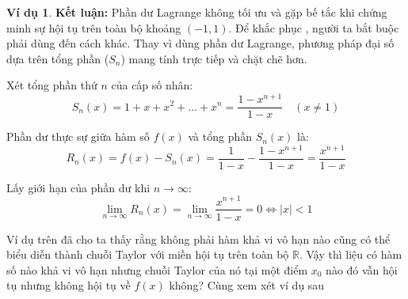 \documentclass[12pt]{article}
\theoremstyle{definition}
\newtheorem*{example}{Ví dụ}
\theoremstyle{remark}
\begin{document}
\begin{example}
\textbf{Kết luận:} Phần dư Lagrange không tối ưu và gặp bế tắc khi chứng minh sự hội tụ trên toàn bộ khoảng $(-1, 1)$. Để khắc phục , người ta bắt buộc phải dùng đến cách khác.
Thay vì dùng phần dư Lagrange, phương pháp đại số dựa trên tổng phần ($S_n$) mang tính trực tiếp và chặt chẽ hơn.

Xét tổng phần thứ $n$ của cấp số nhân:
\begin{equation}
S_n(x) = 1 + x + x^2 + \dots + x^n = \frac{1 - x^{n+1}}{1 - x} \quad (x \neq 1)
\end{equation}

Phần dư thực sự giữa hàm số $f(x)$ và tổng phần $S_n(x)$ là:
\begin{equation}
R_n(x) = f(x) - S_n(x) = \frac{1}{1-x} - \frac{1 - x^{n+1}}{1 - x} = \frac{x^{n+1}}{1-x}
\end{equation}

Lấy giới hạn của phần dư khi $n \to \infty$:
\begin{equation}
\lim_{n \to \infty} R_n(x) = \lim_{n \to \infty} \frac{x^{n+1}}{1-x} = 0 \iff |x| < 1
\end{equation}


\end{example}
Ví dụ trên đã cho ta thấy rằng không phải hàm khả vi vô hạn nào cũng có thể biểu diễn thành chuỗi Taylor với miền hội tụ trên toàn bộ $\mathbb{R}$. Vậy thì liệu có hàm số nào khả vi vô hạn nhưng chuỗi Taylor của nó tại một điểm $x_0$ nào đó vẫn hội tụ nhưng không hội tụ về $f(x)$ không? Cùng xem xét ví dụ sau
\end{document}
